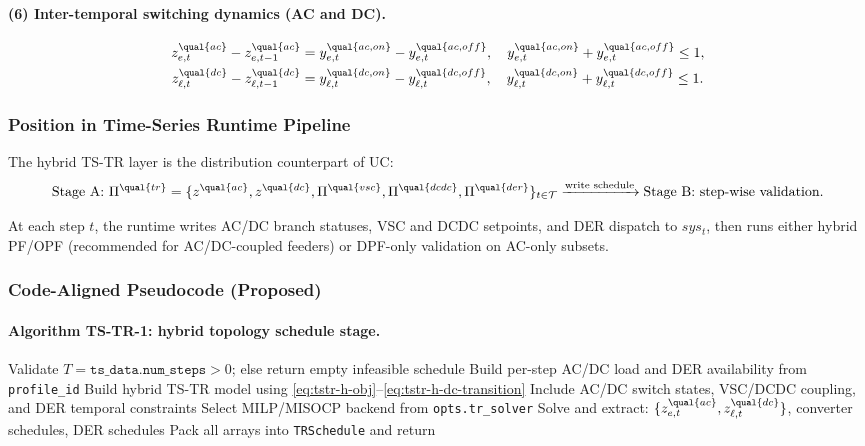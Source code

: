 \paragraph{(6) Inter-temporal switching dynamics (AC and DC).}
\begin{align}
z^{\qual{ac}}_{e,t}-z^{\qual{ac}}_{e,t-1}
&= y^{\qual{ac,on}}_{e,t}-y^{\qual{ac,off}}_{e,t},
\quad
y^{\qual{ac,on}}_{e,t}+y^{\qual{ac,off}}_{e,t}\le 1,
\label{eq:tstr-h-ac-transition}
\\
z^{\qual{dc}}_{\ell,t}-z^{\qual{dc}}_{\ell,t-1}
&= y^{\qual{dc,on}}_{\ell,t}-y^{\qual{dc,off}}_{\ell,t},
\quad
y^{\qual{dc,on}}_{\ell,t}+y^{\qual{dc,off}}_{\ell,t}\le 1.
\label{eq:tstr-h-dc-transition}
\end{align}

\subsubsection{Position in Time-Series Runtime Pipeline}

The hybrid TS-TR layer is the distribution counterpart of UC:
\begin{align}
\text{Stage A: } \Pi^{\qual{tr}} =
\{z^{\qual{ac}},z^{\qual{dc}},\Pi^{\qual{vsc}},\Pi^{\qual{dcdc}},\Pi^{\qual{der}}\}_{t\in\mathcal{T}}
\xrightarrow{\text{write schedule}} \text{Stage B: step-wise validation}.
\end{align}

At each step \(t\), the runtime writes AC/DC branch statuses, VSC and DCDC
setpoints, and DER dispatch to \(sys_t\), then runs either hybrid PF/OPF
(recommended for AC/DC-coupled feeders) or DPF-only validation on AC-only
subsets.

\subsubsection{Code-Aligned Pseudocode (Proposed)}
\label{sec:tstr-pseudocode}

\paragraph{Algorithm TS-TR-1: hybrid topology schedule stage.}
\begin{algorithmic}[1]
  \State Validate \(T=\texttt{ts\_data.num\_steps}>0\); else return empty infeasible schedule
  \State Build per-step AC/DC load and DER availability from \texttt{profile\_id}
  \State Build hybrid TS-TR model using \eqref{eq:tstr-h-obj}--\eqref{eq:tstr-h-dc-transition}
  \State Include AC/DC switch states, VSC/DCDC coupling, and DER temporal constraints
  \State Select MILP/MISOCP backend from \texttt{opts.tr\_solver}
  \State Solve and extract:
  \Statex \quad \(\{z^{\qual{ac}}_{e,t},z^{\qual{dc}}_{\ell,t}\}\), converter schedules, DER schedules
  \State Pack all arrays into \texttt{TRSchedule} and return
\EndProcedure
\end{algorithmic}

